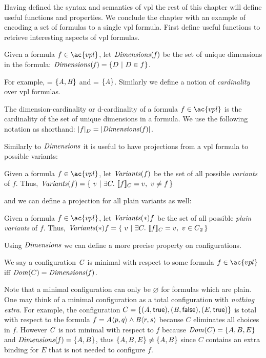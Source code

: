 \label{section:vpl:formalism}
%
Having defined the syntax and semantics of \ac{vpl} the rest of this chapter
will define useful functions and properties. We conclude the chapter with an
example of encoding a set of \pl{} formulas to a single \ac{vpl} formula.
%
First define useful functions to retrieve interesting aspects of \ac{vpl}
formulas.

\begin{definition}[Dimensions]
  Given a formula $f \in \ac{vpl}$, let $\mathit{Dimensions(f)}$ be the set of unique
  dimensions in the formula:  $\mathit{Dimensions(f)} = \{ D\ |\ D \in f \}$.
\end{definition}

For example,  = $\{\mathit{A,B}\}$ and
 = $\{\mathit{A}\}$.
%
Similarly we define a notion of \emph{cardinality} over \ac{vpl} formulas.
%
\begin{definition}
  The dimension-cardinality or d-cardinality of a formula $f \in \ac{vpl}$ is
  the cardinality of the set of unique dimensions in a formula. We use the
  following notation as shorthand: $|f|_{D} = |{\mathit{Dimensions(f)}}|$.
\end{definition}

Similarly to $\mathit{Dimensions}$ it is useful to have projections from a \ac{vpl}
formula to possible variants:
%
\begin{definition}[Variants]
  Given a formula $f \in \ac{vpl}$, let $\mathit{Variants}(f)$ be the set of all
  possible \emph{variants} of $f$. Thus, $\variants{f} = \{\ v\ |\ \exists
  C.\ \sem[C]{f} = v,\ v \neq f \,\}$
\end{definition}
%
and we can define a projection for all plain variants as well:
%
\begin{definition}[\pl{} Variants]
  Given a formula $f \in \ac{vpl}$, let $\mathit{Variants}(*){f}$ be the set of all
  possible \emph{plain variants} of $f$. Thus, $\variants*{f} = \{\ v\ |\ \exists C.\
  \sem[C]{f} = v,\ v \in \pl{} \,\}$
\end{definition}
%
Using $\mathit{Dimensions}$ we can define a more precise property on configurations.
%
\begin{definition}
  We say a configuration $\mathit{C}$ is minimal with respect to some formula $f \in
  \ac{vpl}$ iff $\mathit{Dom}({C}) = \mathit{Dimensions(\mathit{f})}$.
\end{definition}

Note that a minimal configuration can only be $\varnothing$ for formulas which
are plain. One may think of a minimal configuration as a total configuration
with \emph{nothing extra}. For example, the configuration $C = \{\kf{(A,\true),
  (B,\false),(E,\true)}\}$ is total with respect to the formula $f =
\chc[A]{p,q}\wedge\chc[B]{r,s}$ because $C$ eliminates all choices in $f$.
However $\mathit{C}$ is not minimal with respect to $f$ because $\domain{C} =
\set{A, B, E}$ and $\kf{Dimensions(\kf{f})} = \set{A,B}$, thus $\set{A,B,E} \neq
\set{A,B}$ since $C$ contains an extra binding for $E$ that is not needed to
configure $f$.

